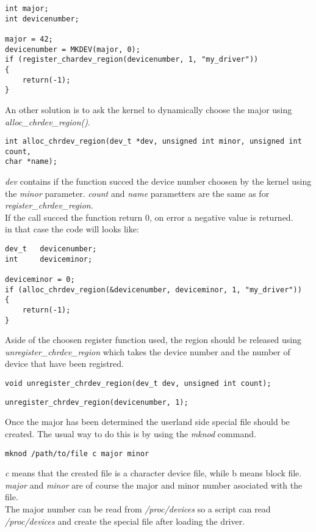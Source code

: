 \documentclass[11pt]{report}
\begin{document}
\begin{lstlisting}
int major;
int devicenumber;

major = 42;
devicenumber = MKDEV(major, 0);
if (register_chardev_region(devicenumber, 1, "my_driver"))
{
    return(-1);
}
\end{lstlisting}
An other solution is to ask the kernel to dynamically choose the major using
{\it alloc\_chrdev\_region()}.
\begin{lstlisting}
int alloc_chrdev_region(dev_t *dev, unsigned int minor, unsigned int count,
char *name);
\end{lstlisting}
{\it dev} contains if the function succed the device number choosen by the
kernel using the {\it minor} parameter.
{\it count} and {\it name} parametters are the same as for {\it
register\_chrdev\_region}.\\
If the call succed the function return 0, on error a negative value is returned.\\
in that case the code will looks like:
\begin{lstlisting}
dev_t   devicenumber;
int     deviceminor;

deviceminor = 0;
if (alloc_chrdev_region(&devicenumber, deviceminor, 1, "my_driver"))
{
    return(-1);
}
\end{lstlisting}
Aside of the choosen register function used, the region should be released using
{\it unregister\_chrdev\_region} which takes the device number and the number
of device that have been registred.
\begin{lstlisting}
void unregister_chrdev_region(dev_t dev, unsigned int count);
\end{lstlisting}
\begin{lstlisting}
unregister_chrdev_region(devicenumber, 1);
\end{lstlisting}
Once the major has been determined the userland side special file should be
created. The usual way to do this is by using the  {\it mknod} command.
\begin{lstlisting}
mknod /path/to/file c major minor
\end{lstlisting}
{\it c} means that the created file is a character device file, while b means block
file.\\
{\it major} and {\it minor} are of course the major and minor number asociated
with the file.\\
The major number can be read from {\it /proc/devices} so a script can read 
{\it /proc/devices} and create the special file after loading the driver.
\end{document}
